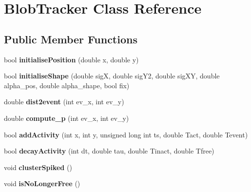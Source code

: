 \hypertarget{classBlobTracker}{\section{Blob\-Tracker Class Reference}
\label{classBlobTracker}
}
\subsection*{Public Member Functions}
\begin{DoxyCompactItemize}
\item 
\hypertarget{classBlobTracker_ac3dbde755642d5e9cf179123823a8eec}{bool {\bfseries initialise\-Position} (double x, double y)}\label{classBlobTracker_ac3dbde755642d5e9cf179123823a8eec}

\item 
\hypertarget{classBlobTracker_a29990e53b163a720f284978b97a6d723}{bool {\bfseries initialise\-Shape} (double sig\-X, double sig\-Y2, double sig\-X\-Y, double alpha\-\_\-pos, double alpha\-\_\-shape, bool fix)}\label{classBlobTracker_a29990e53b163a720f284978b97a6d723}

\item 
\hypertarget{classBlobTracker_a873c6f0932845537163a5b80605ac599}{double {\bfseries dist2event} (int ev\-\_\-x, int ev\-\_\-y)}\label{classBlobTracker_a873c6f0932845537163a5b80605ac599}

\item 
\hypertarget{classBlobTracker_abfe11c1db8b5c9634ec9f5ba86f379d9}{double {\bfseries compute\-\_\-p} (int ev\-\_\-x, int ev\-\_\-y)}\label{classBlobTracker_abfe11c1db8b5c9634ec9f5ba86f379d9}

\item 
\hypertarget{classBlobTracker_ab84953899ecee068e63a8f1a89fe7dd8}{bool {\bfseries add\-Activity} (int x, int y, unsigned long int ts, double Tact, double Tevent)}\label{classBlobTracker_ab84953899ecee068e63a8f1a89fe7dd8}

\item 
\hypertarget{classBlobTracker_af410be534735ad33bafc259d70316a54}{bool {\bfseries decay\-Activity} (int dt, double tau, double Tinact, double Tfree)}\label{classBlobTracker_af410be534735ad33bafc259d70316a54}

\item 
\hypertarget{classBlobTracker_af7a07b561d9516ab480632667672e7ed}{void {\bfseries cluster\-Spiked} ()}\label{classBlobTracker_af7a07b561d9516ab480632667672e7ed}

\item 
\hypertarget{classBlobTracker_ad22b6a8aaf647e71b57fba25f9f419d1}{void {\bfseries is\-No\-Longer\-Free} ()}\label{classBlobTracker_ad22b6a8aaf647e71b57fba25f9f419d1}


\end{DoxyCompactItemize}
